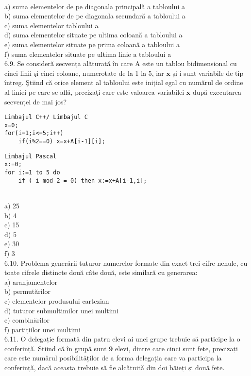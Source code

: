 \\
a) suma elementelor de pe diagonala principală a tabloului a
\\
b) suma elementelor de pe diagonala secundară a tabloului a
\\
c) suma elementelor tabloului a
\\
d) suma elementelor situate pe ultima coloană a tabloului a
\\
e) suma elementelor situate pe prima coloană a tabloului a
\\
f) suma elementelor situate pe ultima linie a tabloului a
\\
6.9. Se consideră secvența alăturată în care A este un tablou bidimensional cu cinci linii şi cinci coloane, numerotate de la 1 la 5, iar $\mathbf{x}$ și i sunt variabile de tip întreg. Ştiind că orice element al tabloului este inițial egal cu numărul de ordine al liniei pe care se află, precizaţi care este valoarea variabilei $\mathbf{x}$ după executarea secvenței de mai jos?
\begin{verbatim}
Limbajul C++/ Limbajul C
x=0;
for(i=1;i<=5;i++)
    if(i%2==0) x=x+A[i-1][i];
\end{verbatim}
\begin{verbatim}
Limbajul Pascal
x:=0;
for i:=1 to 5 do
    if ( i mod 2 = 0) then x:=x+A[i-1,i];
\end{verbatim}
\\
a) 25
\\
b) 4
\\
c) 15
\\
d) 5
\\
e) 30
\\
f) 3
\\
6.10. Problema generării tuturor numerelor formate din exact trei cifre nenule, cu toate cifrele distincte două câte două, este similară cu generarea:
\\
a) aranjamentelor
\\
b) permutărilor
\\
c) elementelor produsului cartezian
\\
d) tuturor submultimilor unei mulțimi
\\
e) combinărilor
\\
f) partițiilor unei mulțimi
\\
6.11. O delegație formată din patru elevi ai unei grupe trebuie să participe la o conferință. Știind că în grupă sunt $\mathbf{9}$ elevi, dintre care cinci sunt fete, precizați care este numărul posibilităț̦ilor de a forma delegația care va participa la conferință, dacă aceasta trebuie să fie alcătuită din doi băieți și două fete.
